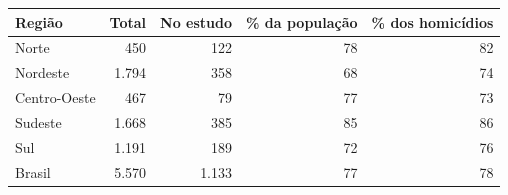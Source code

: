 \begin{tabular}{@{}lrrrr@{}}
\toprule
\textbf{Região} & \textbf{Total} & \textbf{No estudo} & \textbf{\% da população} & \textbf{\% dos homicídios}\\
\midrule
Norte & 450 & 122 & 78 & 82\\
Nordeste & 1.794 & 358 & 68 & 74\\
Centro-Oeste & 467 & 79 & 77 & 73\\
Sudeste & 1.668 & 385 & 85 & 86\\
Sul & 1.191 & 189 & 72 & 76\\
\midrule Brasil & 5.570 & 1.133 & 77 & 78\\
\bottomrule
\end{tabular}
